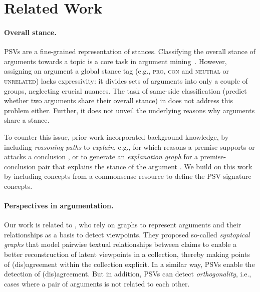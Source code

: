 \section{Related Work}
\paragraph{Overall stance.} 
PSVs are a fine-grained representation of stances. Classifying the overall stance of arguments towards a topic is a core task in argument mining~\citep{bar-haim-etal-2017-stance,kobbe-etal-2020-unsupervised,luo-etal-2020-detecting}. 
However, assigning an argument a global stance tag (e.g., \textsc{pro}, \textsc{con} and \textsc{neutral} or \textsc{unrelated}) lacks expressivity: it divides sets of arguments into only a couple of groups, neglecting crucial nuances. The task of same-side classification (predict whether two arguments share their overall stance) in \citet{hou-jochim-2017-argument,korner-etal-2021-classifying} does not address this problem either. Further, it does not unveil the underlying reasons why arguments share a stance. 

To counter this issue, prior work incorporated background knowledge, by including \textit{reasoning paths} to \textit{explain}, e.g., for which reasons a premise supports or attacks a conclusion \citep{pauletal:2020}, or to generate an \textit{explanation graph} for a premise-conclusion pair that explains the stance of the argument \citep{saha-etal-2021-explagraphs,saadat-yazdi-etal-2023-uncovering,plenz-etal-2023-similarity}. We build on this work by including concepts from a commonsense resource to define the PSV signature concepts. %


\paragraph{Perspectives in argumentation.}

Our work is related to \citet{barrow-etal-2021-syntopical}, who rely on graphs to represent arguments and their relationships as a basis to detect viewpoints. They proposed so-called \textit{syntopical graphs} that model pairwise textual relationships between claims to enable a better reconstruction of latent viewpoints in a collection, thereby making points of (dis)agreement within the collection explicit. %
In a similar way, PSVs enable the detection of (dis)agreement. But in addition, %
PSVs can detect \textit{orthogonality}, i.e., cases where a pair of arguments is not 
related to each other. 

